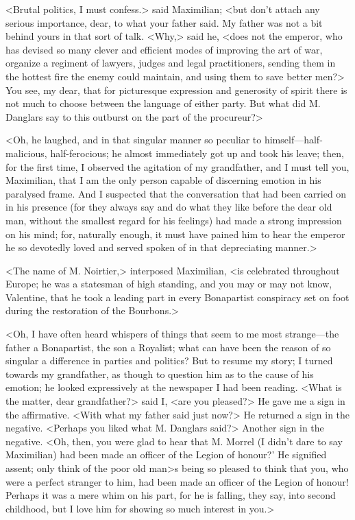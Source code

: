  <Brutal politics, I must confess.> said Maximilian; <but don't attach any serious importance, dear, to what your father said. My father was not a bit behind yours in that sort of talk. <Why,> said he, <does not the emperor, who has devised so many clever and efficient modes of improving the art of war, organize a regiment of lawyers, judges and legal practitioners, sending them in the hottest fire the enemy could maintain, and using them to save better men?> You see, my dear, that for picturesque expression and generosity of spirit there is not much to choose between the language of either party. But what did M. Danglars say to this outburst on the part of the procureur?> 

 <Oh, he laughed, and in that singular manner so peculiar to himself—half-malicious, half-ferocious; he almost immediately got up and took his leave; then, for the first time, I observed the agitation of my grandfather, and I must tell you, Maximilian, that I am the only person capable of discerning emotion in his paralysed frame. And I suspected that the conversation that had been carried on in his presence (for they always say and do what they like before the dear old man, without the smallest regard for his feelings) had made a strong impression on his mind; for, naturally enough, it must have pained him to hear the emperor he so devotedly loved and served spoken of in that depreciating manner.> 

 <The name of M. Noirtier,> interposed Maximilian, <is celebrated throughout Europe; he was a statesman of high standing, and you may or may not know, Valentine, that he took a leading part in every Bonapartist conspiracy set on foot during the restoration of the Bourbons.> 

 <Oh, I have often heard whispers of things that seem to me most strange—the father a Bonapartist, the son a Royalist; what can have been the reason of so singular a difference in parties and politics? But to resume my story; I turned towards my grandfather, as though to question him as to the cause of his emotion; he looked expressively at the newspaper I had been reading. <What is the matter, dear grandfather?> said I, <are you pleased?> He gave me a sign in the affirmative. <With what my father said just now?> He returned a sign in the negative. <Perhaps you liked what M. Danglars said?> Another sign in the negative. <Oh, then, you were glad to hear that M. Morrel (I didn't dare to say Maximilian) had been made an officer of the Legion of honour?' He signified assent; only think of the poor old man>s being so pleased to think that you, who were a perfect stranger to him, had been made an officer of the Legion of honour! Perhaps it was a mere whim on his part, for he is falling, they say, into second childhood, but I love him for showing so much interest in you.> 


